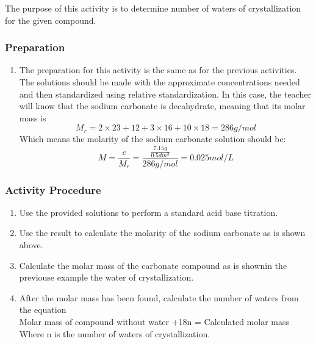The purpose of this activity is to determine number of waters of crystallization for the given compound.

\subsubsection{Preparation}
\begin{enumerate}
\item{The preparation for this activity is the same as for the previous activities. The solutions should be made with the approximate concentrations needed and then standardized using relative standardization. In this case, the teacher will know that the sodium carbonate is decahydrate, meaning that its molar mass is
$$M_r = 2 \times 23 + 12 + 3 \times 16 + 10 \times 18 = 286 g/mol$$
Which means the molarity of the sodium carbonate solution should be:
$$M = \frac{c}{M_r} = \frac{\frac{7.15g}{0.5dm^{3}}}{286 g/mol} = 0.025 mol/L$$}
\end{enumerate}
\subsubsection{Activity Procedure}
\begin{enumerate}
\item {Use the provided solutions to perform a standard acid base titration.}
\item{Use the result to calculate the molarity of the sodium carbonate as is shown above.}
\item{Calculate the molar mass of the carbonate compound as is shownin the previouse example the water of crystallization.}
\item {After the molar mass has been found, calculate the number of waters from the equation \\

Molar mass of compound without water +18n = Calculated  molar mass\\

Where n is the number of waters of crystallization.}
\end{enumerate} 
